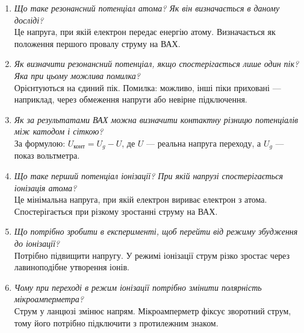 \documentclass[12pt,a4paper]{article}
\begin{document}
\begin{enumerate}
        \item \textit{Що таке резонансний потенціал атома? Як він визначається в даному досліді?}\\[0.5em]
        Це напруга, при якій електрон передає енергію атому. Визначається як положення першого провалу струму на ВАХ.

        \item \textit{Як визначити резонансний потенціал, якщо спостерігається лише один пік? Яка при цьому можлива помилка?}\\[0.5em]
        Орієнтуються на єдиний пік. Помилка: можливо, інші піки приховані — наприклад, через обмеження напруги або невірне підключення.

        \item \textit{Як за результатами ВАХ можна визначити контактну різницю потенціалів між катодом і сіткою?}\\[0.5em]
        За формулою: $U_{\text{конт}} = U_g - U$, де $U$ — реальна напруга переходу, а $U_g$ — показ вольтметра.

        \item \textit{Що таке перший потенціал іонізації? При якій напрузі спостерігається іонізація атома?}\\[0.5em]
        Це мінімальна напруга, при якій електрон вириває електрон з атома. Спостерігається при різкому зростанні струму на ВАХ.

        \item \textit{Що потрібно зробити в експерименті, щоб перейти від режиму збудження до іонізації?}\\[0.5em]
        Потрібно підвищити напругу. У режимі іонізації струм різко зростає через лавиноподібне утворення іонів.

        \item \textit{Чому при переході в режим іонізації потрібно змінити полярність мікроамперметра?}\\[0.5em]
        Струм у ланцюзі змінює напрям. Мікроамперметр фіксує зворотний струм, тому його потрібно підключити з протилежним знаком.
    \end{enumerate}
\end{document}

